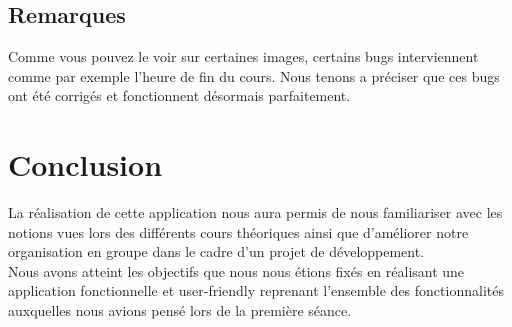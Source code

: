 \documentclass{article}
\begin{document}
          \subsection{Remarques}
          Comme vous pouvez le voir sur certaines images, certains bugs interviennent comme par exemple l'heure de fin du cours. Nous tenons a pr\'eciser que ces bugs ont \'et\'e corrig\'es et fonctionnent d\'esormais parfaitement.

    \section{Conclusion}
	La réalisation de cette application nous aura permis de nous familiariser avec les notions vues lors des différents cours théoriques ainsi que d'améliorer notre organisation en groupe dans le cadre d'un projet de développement. \\
	
	Nous avons atteint les objectifs que nous nous étions fixés en réalisant une application fonctionnelle et user-friendly reprenant l'ensemble des fonctionnalités auxquelles nous avions pensé lors de la première séance.
\end{document}
